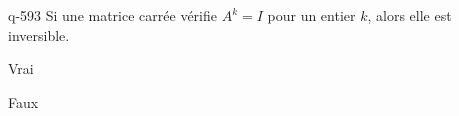 \begin{truefalse}{q-593}
Si une matrice carrée vérifie $A^k=I$ pour un entier $k$, alors elle est inversible.
\item Vrai
\item* Faux
\end{truefalse}


